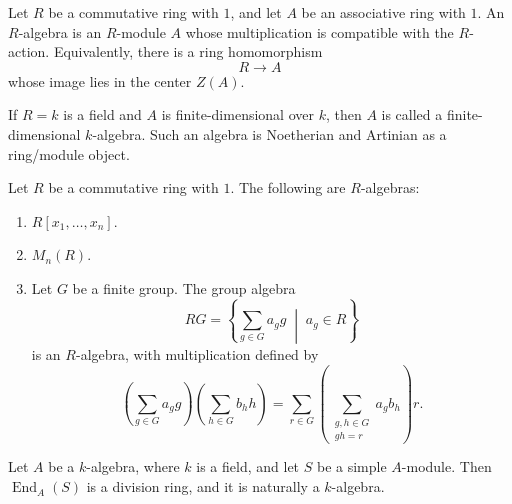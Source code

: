 \begin{definition}
    Let $R$ be a commutative ring with $1$, and let $A$ be an associative ring with $1$.
    An $R$-algebra is an $R$-module $A$ whose multiplication is compatible with the $R$-action.
    Equivalently, there is a ring homomorphism
    \[
        R \to A
    \]
    whose image lies in the center $Z(A)$.
\end{definition}

\begin{remark}
    If $R=k$ is a field and $A$ is finite-dimensional over $k$, then $A$ is called a finite-dimensional $k$-algebra.
    Such an algebra is Noetherian and Artinian as a ring/module object.
\end{remark}

\begin{example}
    Let $R$ be a commutative ring with $1$. The following are $R$-algebras:
    \begin{enumerate}
        \item $R[x_1,\dots,x_n]$.
        \item $M_n(R)$.
        \item Let $G$ be a finite group. The group algebra
              \[
                  RG=\left\{\sum_{g\in G} a_g g \;\middle|\; a_g\in R\right\}
              \]
              is an $R$-algebra, with multiplication defined by
              \[
                  \left(\sum_{g\in G} a_g g\right)\left(\sum_{h\in G} b_h h\right)
                  =
                  \sum_{r\in G}\left(\sum_{\substack{g,h\in G\\ gh=r}} a_g b_h\right) r.
              \]
    \end{enumerate}
\end{example}

\begin{lemma}
    Let $A$ be a $k$-algebra, where $k$ is a field, and let $S$ be a simple $A$-module.
    Then $\operatorname{End}_A(S)$ is a division ring, and it is naturally a $k$-algebra.
\end{lemma}

